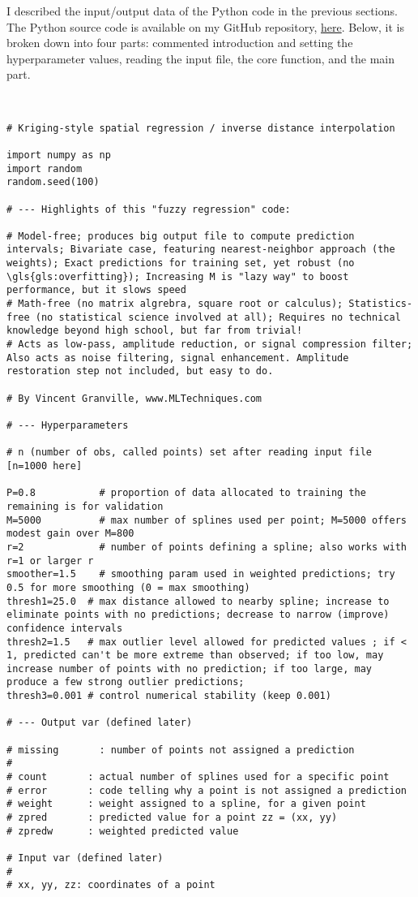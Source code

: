 \documentclass[oneside,10pt]{book}
\begin{document}
I described the input/output data of the Python code in the previous sections. The Python source code is available on my GitHub repository, \href{https://github.com/VincentGranville/Machine-Learning}{here}. Below, it is broken down into four parts: commented introduction and setting the hyperparameter values,
 reading the input file, the core function, and the main part. 

\quad \\
{}

\begin{lstlisting}
# Kriging-style spatial regression / inverse distance interpolation

import numpy as np
import random
random.seed(100)

# --- Highlights of this "fuzzy regression" code:

# Model-free; produces big output file to compute prediction intervals; Bivariate case, featuring nearest-neighbor approach (the weights); Exact predictions for training set, yet robust (no \gls{gls:overfitting}); Increasing M is "lazy way" to boost performance, but it slows speed
# Math-free (no matrix algrebra, square root or calculus); Statistics-free (no statistical science involved at all); Requires no technical knowledge beyond high school, but far from trivial!
# Acts as low-pass, amplitude reduction, or signal compression filter; Also acts as noise filtering, signal enhancement. Amplitude restoration step not included, but easy to do.

# By Vincent Granville, www.MLTechniques.com

# --- Hyperparameters

# n (number of obs, called points) set after reading input file [n=1000 here]

P=0.8           # proportion of data allocated to training the remaining is for validation
M=5000          # max number of splines used per point; M=5000 offers modest gain over M=800
r=2             # number of points defining a spline; also works with r=1 or larger r
smoother=1.5    # smoothing param used in weighted predictions; try 0.5 for more smoothing (0 = max smoothing)
thresh1=25.0  # max distance allowed to nearby spline; increase to eliminate points with no predictions; decrease to narrow (improve) confidence intervals
thresh2=1.5   # max outlier level allowed for predicted values ; if < 1, predicted can't be more extreme than observed; if too low, may increase number of points with no prediction; if too large, may produce a few strong outlier predictions;
thresh3=0.001 # control numerical stability (keep 0.001)

# --- Output var (defined later) 

# missing       : number of points not assigned a prediction
#
# count       : actual number of splines used for a specific point
# error       : code telling why a point is not assigned a prediction
# weight      : weight assigned to a spline, for a given point
# zpred       : predicted value for a point zz = (xx, yy)
# zpredw      : weighted predicted value

# Input var (defined later)
#
# xx, yy, zz: coordinates of a point 
\end{lstlisting}
\end{document}
